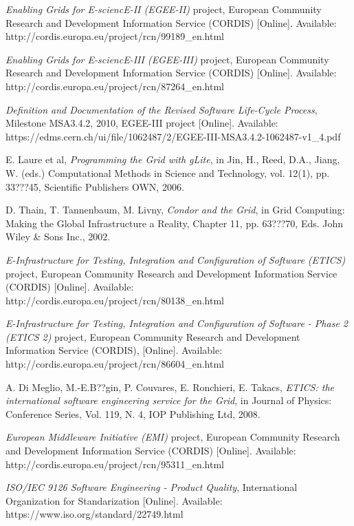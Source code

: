 \documentclass[journal]{IEEEtran}
\begin{document}
\begin{thebibliography}{1}
\emph{Enabling Grids for E-sciencE-II (EGEE-II)} project, European Community
Research and Development Information Service (CORDIS) [Online]. Available:
http://cordis.europa.eu/project/rcn/99189\_en.html

\emph{Enabling Grids for E-sciencE-III (EGEE-III)} project, European Community
Research and Development Information Service (CORDIS) [Online]. Available:
http://cordis.europa.eu/project/rcn/87264\_en.html

\emph{Definition and Documentation of the Revised Software Life-Cycle Process},
Milestone MSA3.4.2, 2010, EGEE-III project [Online]. Available: https://edms.cern.ch/ui/file/1062487/2/EGEE-III-MSA3.4.2-1062487-v1\_4.pdf

E. Laure et al, \emph{Programming the Grid with gLite}, in Jin, H., Reed, D.A.,
Jiang, W. (eds.) Computational Methods in Science and Technology, vol. 12(1),
pp. 33???45, Scientific Publishers OWN, 2006.

D. Thain, T. Tannenbaum, M. Livny, \emph{Condor and the Grid}, in Grid
Computing: Making the Global Infrastructure a Reality, Chapter 11, pp. 63???70,
Eds. John Wiley \& Sons Inc., 2002.

\emph{E-Infrastructure for Testing, Integration and Configuration of Software
(ETICS)} project, European Community Research and Development Information
Service (CORDIS) [Online]. Available: http://cordis.europa.eu/project/rcn/80138\_en.html

\emph{E-Infrastructure for Testing, Integration and Configuration of Software -
Phase 2 (ETICS 2)} project, European Community Research and Development
Information Service (CORDIS), [Online]. Available: http://cordis.europa.eu/project/rcn/86604\_en.html

A. Di Meglio, M.-E.B??gin, P. Couvares, E. Ronchieri, E. Takacs, \emph{ETICS:
the international software engineering service for the Grid}, in Journal of
Physics: Conference Series, Vol. 119, N. 4, IOP Publishing Ltd, 2008.

\emph{European Middleware Initiative (EMI)} project, European Community
Research and Development Information Service (CORDIS) [Online]. Available:
http://cordis.europa.eu/project/rcn/95311\_en.html

\emph{ISO/IEC 9126 Software Engineering - Product Quality}, International
Organization for Standarization [Online]. Available: https://www.iso.org/standard/22749.html


\end{thebibliography}
\end{document}
